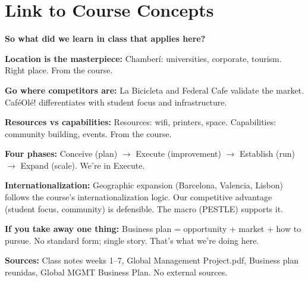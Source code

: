\documentclass[12pt,a4paper]{article}
\begin{document}
\vspace{0.5em}
\noindent{\color{sectionblue}\rule{\textwidth}{0.4pt}}

\vspace{0.5em}
\noindent{\color{sectionblue}\rule{\textwidth}{0.4pt}}

\section*{\color{sectionblue}Link to Course Concepts}\label{sec:venture}

\textbf{So what did we learn in class that applies here?}

\textbf{\textcolor{cafebrown}{Location is the masterpiece:}} Chamber\'i: universities, corporate, tourism. Right place. From the course.

\textbf{\textcolor{cafebrown}{Go where competitors are:}} La Bicicleta and Federal Cafe validate the market. Caf\'eOl\'e! differentiates with student focus and infrastructure.

\textbf{\textcolor{cafebrown}{Resources vs capabilities:}} Resources: wifi, printers, space. Capabilities: community building, events. From the course.

\textbf{\textcolor{cafebrown}{Four phases:}} Conceive (plan) $\rightarrow$ Execute (improvement) $\rightarrow$ Establish (run) $\rightarrow$ Expand (scale). We're in Execute.

\textbf{\textcolor{cafebrown}{Internationalization:}} Geographic expansion (Barcelona, Valencia, Lisbon) follows the course's internationalization logic. Our competitive advantage (student focus, community) is defensible. The macro (PESTLE) supports it.

\textbf{If you take away one thing:} Business plan = opportunity + market + how to pursue. No standard form; single story. That's what we're doing here.

\vspace{0.5em}
\noindent{\color{sectionblue}\rule{\textwidth}{0.4pt}}

\small\textcolor{notegrey}{\textbf{Sources:} Class notes weeks 1--7, Global Management Project.pdf, Business plan reunidas, Global MGMT Business Plan. No external sources.}
\end{document}
